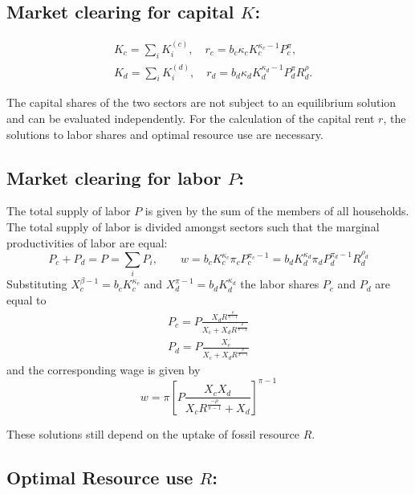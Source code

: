 \subsection{Market clearing for capital $K$:}

\begin{align}
	&K_c = \sum_i K_i^{(c)}, \quad r_c = b_c\kappa_c K_c^{\kappa_c-1} P_c^{\pi}, \\
	&K_d = \sum_i K_i^{(d)}, \quad r_d = b_d\kappa_d K_d^{\kappa_d-1} P_d^{\pi}R_d^{\rho}.
	\label{capital_market_clearing}
\end{align}

The capital shares of the two sectors are not subject to an equilibrium solution and can be evaluated independently. For the calculation of the capital rent $r$, the solutions to labor shares and optimal resource use are necessary.

\subsection{Market clearing for labor $P$:}
The total supply of labor $P$ is given by the sum of the members of all households. The total supply of labor is divided amongst sectors such that the marginal productivities of labor are equal:
\begin{equation}
	P_c + P_d = P = \sum_i P_i, \qquad w = b_c K_c^{\kappa_c}\pi_c P_c^{\pi_c-1}=  b_d K_d^{\kappa_d}\pi_d P_d^{\pi_d-1}R_d^{\rho_d} 
	\label{labour_market_clearing}
\end{equation}
Substituting $X_c^{\beta-1} = b_c K_c^{\kappa_c}$ and $X_d^{\pi-1} = b_d K_d^{\kappa_d}$ the labor shares $P_c$ and $P_d$ are equal to
\begin{align}
	P_c = P \frac{X_d R^{\frac{\rho}{\pi-1}}}{X_c + X_d R^{\frac{\rho}{\pi-1}}} \label{labor_share_Pc}  \\
	P_d = P \frac{X_c}{X_c + X_d R^{\frac{\rho}{\pi-1}}} \label{labor_share_Pd}	
\end{align}
and the corresponding wage is given by
\begin{equation}
	w = \pi \left[ P \frac{X_c X_d}{X_c R^{\frac{-\rho}{\pi-1}} + X_d} \right]^{\pi-1}
	\label{wage}
\end{equation}

These solutions still depend on the uptake of fossil resource $R$.

\subsection{Optimal Resource use $R$:}

